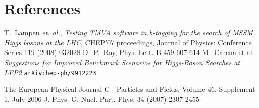 \documentclass[a4paper]{jpconf}
\begin{document}
\section*{References}

\begin{thebibliography}{9}

 T.~Lampen {\em et. al.}, \emph{Testing TMVA software in b-tagging 
                  for the search of MSSM Higgs bosons at the LHC},
CHEP’07 proceedings, Journal of Physics: Conference Series 119 (2008) 032028
 D.~P.~Roy, Phys. Lett. B 459 607-614
 M.~Carena et al. \emph{Suggestions for Improved Benchmark Scenarios for Higgs-Boson Searches at LEP2} 
{\tt arXiv:hep-ph/9912223} %

  The European Physical Journal C - Particles and Fields, Volume 46, Supplement 1, July 2006
 J. Phys. G: Nucl. Part. Phys. 34 (2007) 2307-2455


\end{thebibliography}
\end{document}
